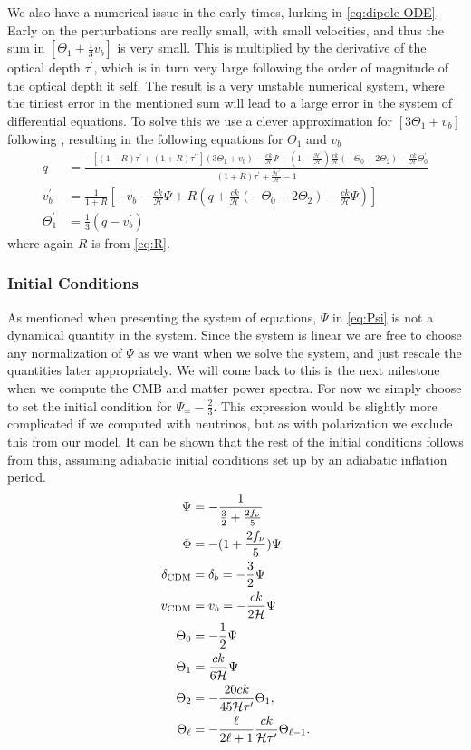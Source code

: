 \documentclass[10pt,a4paper]{article}
\begin{document}
We also have a numerical issue in the early times, lurking in \cref{eq:dipole ODE}. Early on the perturbations are really small, with small velocities, and thus the sum in $\left[\Theta_1 + \frac{1}{3}v_b\right]$ is very small. This is multiplied by the derivative of the optical depth $\tau^\prime$, which is in turn very large following the order of magnitude of the optical depth it self. The result is a very unstable numerical system, where the tiniest error in the mentioned sum will lead to a large error in the system of differential equations. To solve this we use a clever approximation for $\left[3\Theta_1 + v_b\right]$ following \cite{Calin}, resulting in the following equations for $\Theta_1$ and $v_b$
\begin{align}
  q &= \frac{-[(1-R)\tau^\prime + (1+R)\tau^{\prime\prime}](3\Theta_1+v_b) -
  \frac{ck}{\mathcal{H}}\Psi + (1-\frac{\mathcal{H}^\prime}{\mathcal{H}})\frac{ck}{\mathcal{H}}(-\Theta_0 +
  2\Theta_2) - \frac{ck}{\mathcal{H}}\Theta_0^\prime}{(1+R)\tau^\prime + \frac{\mathcal{H}^\prime}{\mathcal{H}} -
  1}
  \\
  v_b^\prime &= \frac{1}{1+R} \left[-v_b - \frac{ck}{\mathcal{H}}\Psi + R(q +
  \frac{ck}{\mathcal{H}}(-\Theta_0 + 2\Theta_2) - \frac{ck}{\mathcal{H}}\Psi)\right]
  \\
  \Theta^\prime_1 &= \frac{1}{3} (q - v_b^\prime)
\end{align}
where again $R$ is from \cref{eq:R}.

\subsubsection{Initial Conditions}
\label{subsubsec:Theory/Initial conditions}
As mentioned when presenting the system of equations, $\Psi$ in \cref{eq:Psi} is not a dynamical quantity in the system. Since the system is linear we are free to choose any normalization of $\Psi$ as we want when we solve the system, and just rescale the quantities later appropriately. We will come back to this is the next milestone when we compute the CMB and matter power spectra. For now we simply choose to set the initial condition for $\Psi_ = -\frac{2}{3}$. This expression would be slightly more complicated if we computed with neutrinos, but as with polarization we exclude this from our model. It can be shown that the rest of the initial conditions follows from this, assuming adiabatic initial conditions set up by an adiabatic inflation period.
\begin{align}
  \Psi &= -\frac{1}{\frac{3}{2} + \frac{2f_\nu}{5}}
  \\
  \Phi &= -(1+\frac{2f_\nu}{5})\Psi
  \\
  \delta_{\rm CDM} &= \delta_b = -\frac{3}{2} \Psi 
  \\
  v_{\rm CDM} &= v_b = -\frac{ck}{2\mathcal{H}} \Psi
  \\
  \Theta_0 &= -\frac{1}{2} \Psi 
  \\
  \Theta_1 &= \frac{ck}{6\mathcal{H}}\Psi 
  \\
  \Theta_2 &= -\frac{20ck}{45\mathcal{H}\tau^\prime} \Theta_1,
  \\
  \Theta_\ell &= -\frac{\ell}{2\ell+1} \frac{ck}{\mathcal{H}\tau^\prime} \Theta_{\ell-1}.
\end{align}
\end{document}
